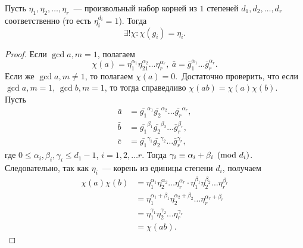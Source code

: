 \begin{nlemma}
\label{lm:II-1}
    Пусть $\eta_1, \eta_2, \dots, \eta_r$ --- произвольный набор корней из $1$ степеней $d_1, d_2, \dots, d_r$ соответственно (то есть $\eta_i^{d_i} = 1$). Тогда 
    \[
        \exists! \chi\colon \chi\left(g_i\right) = \eta_i.
    \]
\end{nlemma}
\begin{proof}
    \vfill
    Если $\gcd{a, m} = 1$, полагаем 
    \[
        \chi(a) = \eta_1^{\alpha_1} \eta_21^{\alpha_2} \dots \eta_r^{\alpha_r}, \ \bar{a} = \bar{g}_1^{\alpha_1} \dots \bar{g}_r^{\alpha_r}.
    \]
    Если же $\gcd{a, m} \ne 1$, то полагаем $\chi(a) = 0$.~\newline Достаточно проверить, что если $\gcd{a, m} = 1$, $\gcd{b, m} = 1$, то тогда справедливо $\chi(ab) = \chi(a)\chi(b)$.~\newline
    Пусть 
    \begin{align*}
        \bar{a} &= \bar{g_1}^{\alpha_1} \bar{g_2}^{\alpha_2} \dots \bar{g_r}^{\alpha_r}, \\
        \bar{b} &= \bar{g_1}^{\beta_1} \bar{g_2}^{\beta_2} \dots \bar{g}_r^{\beta_r}, \\
        \bar{c} &= \bar{g_1}^{\gamma_1} \bar{g_2}^{\gamma_2} \dots \bar{g}_r^{\gamma_r},
    \end{align*}
    где $0 \le \alpha_i, \beta_i, \gamma_i \le d_1 - 1$, $i = 1, 2, \dots r$.
    Тогда $\gamma_i \equiv \alpha_i + \beta_i \pmod {d_i}$. Следовательно, так как $\eta_i$ --- корень из единицы степени $d_i$, получаем
    \begin{align*}
        \chi(a)\chi(b) &= \eta_1^{\alpha_1} \eta_2^{\alpha_2} \dots \eta_r^{\alpha_r} \cdot \eta_1^{\beta_1} \eta_2^{\beta_2} \dots \eta_r^{\beta_r} \\
        &= \eta_1^{\alpha_1 + \beta_1} \eta_2^{\alpha_2 + \beta_2} \dots \eta_r^{\alpha_r + \beta_r} \\
        &= \eta_1^{\gamma_1} \eta_2^{\gamma_2} \dots \eta_r^{\gamma_r} \\
        &= \chi(ab).
    \end{align*}
\end{proof}

